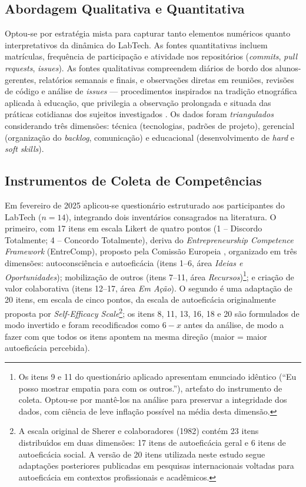 \documentclass[12pt,a4paper]{article}
\begin{document}
\subsection{Abordagem Qualitativa e Quantitativa}
\label{sec:abordagem}

Optou-se por estrat\'egia mista para capturar tanto elementos num\'ericos
quanto interpretativos da din\^amica do LabTech. As fontes quantitativas
incluem matr\'iculas, frequ\^encia de participa\c{c}\~ao e atividade nos
reposit\'orios (\emph{commits}, \emph{pull requests}, \emph{issues}). As
fontes qualitativas compreendem di\'arios de bordo dos alunos-gerentes,
relat\'orios semanais e finais, e observa\c{c}\~oes diretas em reuni\~oes,
revis\~oes de c\'odigo e an\'alise de \emph{issues} --- procedimentos
inspirados na tradi\c{c}\~ao etnogr\'afica aplicada \`a educa\c{c}\~ao,
que privilegia a observa\c{c}\~ao prolongada e situada das pr\'aticas
cotidianas dos sujeitos investigados \cite{mattos2011etnografia}. Os dados foram
\emph{triangulados} considerando tr\^es dimens\~oes: t\'ecnica
(tecnologias, padr\~oes de projeto), gerencial (organiza\c{c}\~ao do
\emph{backlog}, comunica\c{c}\~ao) e educacional (desenvolvimento de
\emph{hard} e \emph{soft skills}).

\subsection{Instrumentos de Coleta de Compet\^encias}
\label{sec:instrumentos}

Em fevereiro de 2025 aplicou-se question\'ario estruturado aos
participantes do LabTech ($n=14$), integrando dois invent\'arios
consagrados na literatura. O primeiro, com 17 itens em escala Likert de
quatro pontos (1 -- Discordo Totalmente; 4 -- Concordo Totalmente),
deriva do \emph{Entrepreneurship Competence Framework} (EntreComp),
proposto pela Comiss\~ao Europeia \cite{bacigalupo2016entrecomp},
organizado em tr\^es dimens\~oes: autoconsci\^encia e autoefic\'acia
(itens 1--6, \'area \emph{Ideias e Oportunidades}); mobiliza\c{c}\~ao de
outros (itens 7--11, \'area \emph{Recursos})\footnote{Os itens 9 e 11 do
question\'ario aplicado apresentam enunciado id\^entico (``Eu posso
mostrar empatia para com os outros.''), artefato do instrumento de
coleta. Optou-se por mant\^e-los na an\'alise para preservar a integridade
dos dados, com ci\^encia de leve infla\c{c}\~ao poss\'ivel na m\'edia desta
dimens\~ao.}; e cria\c{c}\~ao de valor colaborativa (itens 12--17, \'area
\emph{Em A\c{c}\~ao}). O segundo \'e uma adapta\c{c}\~ao de 20 itens, em
escala de cinco pontos, da escala de autoefic\'acia originalmente proposta
por  \emph{Self-Efficacy Scale}\footnote{A
escala original de Sherer e colaboradores (1982) cont\'em 23 itens
distribu\'\i dos em duas dimens\~oes: 17 itens de autoefic\'acia geral e 6
itens de autoefic\'acia social. A vers\~ao de 20 itens utilizada neste
estudo segue adapta\c{c}\~oes posteriores publicadas em pesquisas
internacionais voltadas para autoefic\'acia em contextos profissionais e
acad\^emicos.}; os itens 8, 11, 13, 16, 18 e 20 s\~ao formulados de modo
invertido e foram recodificados como $6-x$ antes da an\'alise, de modo a
fazer com que todos os itens apontem na mesma dire\c{c}\~ao
(maior = maior autoefic\'acia percebida).
\end{document}
